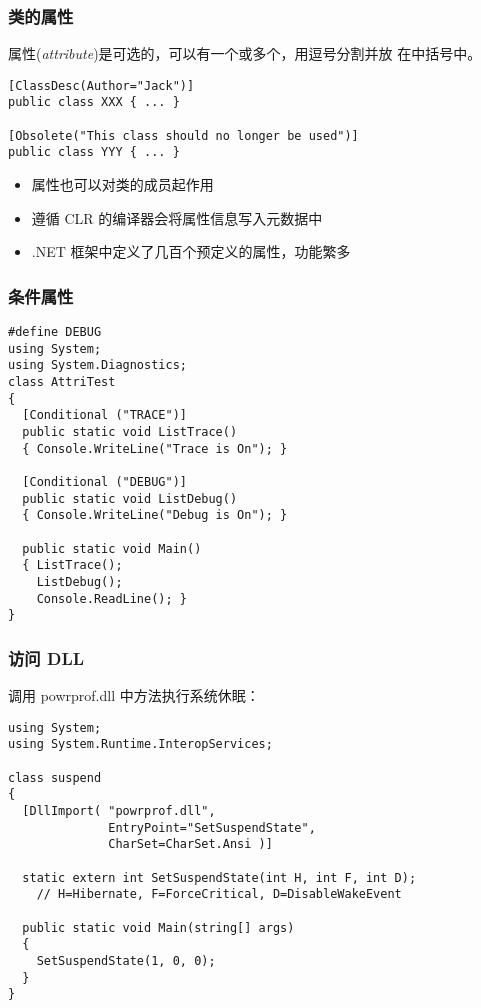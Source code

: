 \begin{frame}[fragile]
\frametitle{类的属性}
\CJKindent 属性(\textit{attribute})是可选的，可以有一个或多个，用逗号分割并放
在中括号中。

\begin{lstlisting}
[ClassDesc(Author="Jack")]
public class XXX { ... }

[Obsolete("This class should no longer be used")]
public class YYY { ... }

\end{lstlisting}
\pause

\begin{itemize}
\item 属性也可以对类的成员起作用
\item 遵循 CLR 的编译器会将属性信息写入元数据中
\item .NET 框架中定义了几百个预定义的属性，功能繁多
\end{itemize}
\end{frame}

\begin{frame}[fragile]
\frametitle{条件属性}
\begin{lstlisting}
#define DEBUG
using System;
using System.Diagnostics;
class AttriTest
{
  [Conditional ("TRACE")]
  public static void ListTrace()
  { Console.WriteLine("Trace is On"); }

  [Conditional ("DEBUG")]
  public static void ListDebug()
  { Console.WriteLine("Debug is On"); }

  public static void Main()
  { ListTrace();
    ListDebug();
    Console.ReadLine(); }
}
\end{lstlisting}
\end{frame}

\begin{frame}[fragile]
\frametitle{访问 DLL}
调用 powrprof.dll 中方法执行系统休眠：
\begin{lstlisting}
using System;
using System.Runtime.InteropServices;

class suspend
{
  [DllImport( "powrprof.dll",
              EntryPoint="SetSuspendState",
              CharSet=CharSet.Ansi )]

  static extern int SetSuspendState(int H, int F, int D);
    // H=Hibernate, F=ForceCritical, D=DisableWakeEvent

  public static void Main(string[] args)
  {
    SetSuspendState(1, 0, 0);
  }
}
\end{lstlisting}
\end{frame}


